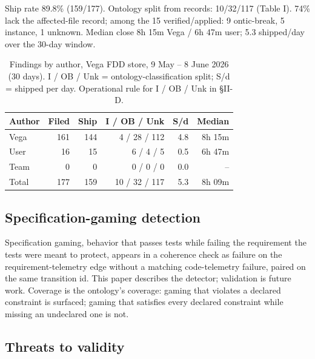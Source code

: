 \documentclass[conference,10pt]{IEEEtran}
\begin{document}
Ship rate 89.8\% (159/177). Ontology split from records: 10/32/117
(Table I). 74\% lack the affected-file record; among the 15
verified/applied: 9 ontic-break, 5 instance, 1 unknown. Median close
8h 15m Vega / 6h 47m user; 5.3 shipped/day over the 30-day window.

\begin{table}[!t]
\centering

\caption{Findings by author, Vega FDD store, 9 May -- 8 June 2026 (30 days). I / OB / Unk = ontology-classification split; S/d = shipped per day. Operational rule for I / OB / Unk in §II-D.}\label{tab:findings-by-path}
\small
\begin{tabular}{@{}lrrrrr@{}}
\hline
Author & Filed & Ship & I / OB / Unk & S/d & Median \\
\hline
Vega   & 161 & 144 & 4 / 28 / 112 & 4.8 & 8h 15m \\
User   &  16 &  15 & 6 /  4 /   5 & 0.5 & 6h 47m \\
Team   &   0 &   0 & 0 /  0 /   0 & 0.0 & --     \\
\hline
Total  & 177 & 159 & 10 / 32 / 117 & 5.3 & 8h 09m \\
\hline
\end{tabular}

\end{table}

\subsection{Specification-gaming detection}\label{sec:res-gaming}

Specification gaming, behavior that passes tests while failing the
requirement the tests were meant to protect, appears in a coherence
check as failure on the requirement-telemetry edge without a matching
code-telemetry failure, paired on the same transition id. This paper
describes the detector; validation is future work. Coverage is the
ontology's coverage: gaming that violates a declared constraint is
surfaced; gaming that satisfies every declared constraint while missing
an undeclared one is not.

\subsection{Threats to validity}\label{sec:threats}
\end{document}

